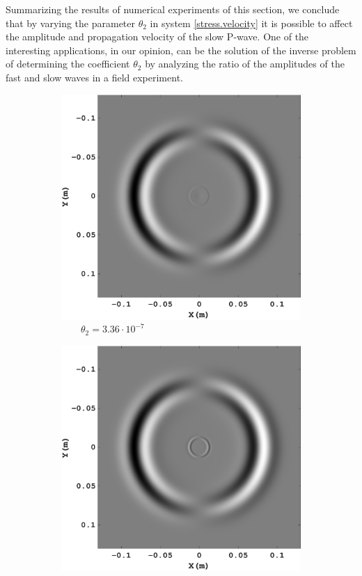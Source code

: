 \documentclass[3p,times,table]{article}
\begin{document}
Summarizing  the results of numerical experiments of this section, we conclude 
that by varying the parameter $\theta_2$ in system \eqref{stress.velocity} it 
is possible to affect the amplitude and  propagation velocity of the slow 
P-wave. One of the interesting applications, in our opinion, can be the 
solution of the inverse problem of determining the coefficient $\theta_2$ by 
analyzing the ratio of the amplitudes of the fast and slow waves in a field 
experiment.
\begin{figure}[!htbp]
\begin{subfigure}{0.3\linewidth}
\centering
\includegraphics[draft=false,width=1\textwidth]{Figures/Xi_11_new}
\caption{$ \quad\quad \theta_2=3.36\cdot10^{-7} $}
\end{subfigure}
\hfill
\begin{subfigure}{0.3\linewidth}
\includegraphics[draft=false,width=1\textwidth]{Figures/Xi_21_new}

\end{subfigure}
\end{figure}
\end{document}
